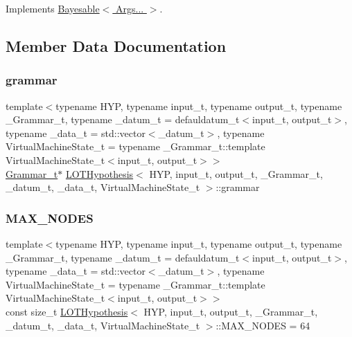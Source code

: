 Implements \hyperlink{class_bayesable_afcea9b439bcf321d5354710d8861cb54}{Bayesable$<$ Args... $>$}.



\subsection{Member Data Documentation}
\mbox{\label{class_l_o_t_hypothesis_affae32db28c39df676809ae47e14e7cf}} 
\subsubsection{\texorpdfstring{grammar}{grammar}}
{\footnotesize\ttfamily template$<$typename H\+YP, typename input\+\_\+t, typename output\+\_\+t, typename \+\_\+\+Grammar\+\_\+t, typename \+\_\+datum\+\_\+t = defauldatum\+\_\+t$<$input\+\_\+t, output\+\_\+t$>$, typename \+\_\+data\+\_\+t = std\+::vector$<$\+\_\+datum\+\_\+t$>$, typename Virtual\+Machine\+State\+\_\+t = typename \+\_\+\+Grammar\+\_\+t\+::template Virtual\+Machine\+State\+\_\+t$<$input\+\_\+t, output\+\_\+t$>$$>$ \\
\hyperlink{class_l_o_t_hypothesis_a8006204013d471860e54c49d19edbace}{Grammar\+\_\+t}$\ast$ \hyperlink{class_l_o_t_hypothesis}{L\+O\+T\+Hypothesis}$<$ H\+YP, input\+\_\+t, output\+\_\+t, \+\_\+\+Grammar\+\_\+t, \+\_\+datum\+\_\+t, \+\_\+data\+\_\+t, Virtual\+Machine\+State\+\_\+t $>$\+::grammar}

\mbox{\label{class_l_o_t_hypothesis_a0231650d938c098118a4c4bdb201fc61}} 
\subsubsection{\texorpdfstring{M\+A\+X\+\_\+\+N\+O\+D\+ES}{MAX\_NODES}}
{\footnotesize\ttfamily template$<$typename H\+YP, typename input\+\_\+t, typename output\+\_\+t, typename \+\_\+\+Grammar\+\_\+t, typename \+\_\+datum\+\_\+t = defauldatum\+\_\+t$<$input\+\_\+t, output\+\_\+t$>$, typename \+\_\+data\+\_\+t = std\+::vector$<$\+\_\+datum\+\_\+t$>$, typename Virtual\+Machine\+State\+\_\+t = typename \+\_\+\+Grammar\+\_\+t\+::template Virtual\+Machine\+State\+\_\+t$<$input\+\_\+t, output\+\_\+t$>$$>$ \\
const size\+\_\+t \hyperlink{class_l_o_t_hypothesis}{L\+O\+T\+Hypothesis}$<$ H\+YP, input\+\_\+t, output\+\_\+t, \+\_\+\+Grammar\+\_\+t, \+\_\+datum\+\_\+t, \+\_\+data\+\_\+t, Virtual\+Machine\+State\+\_\+t $>$\+::M\+A\+X\+\_\+\+N\+O\+D\+ES = 64\hspace{0.3cm}{\ttfamily [static]}}

